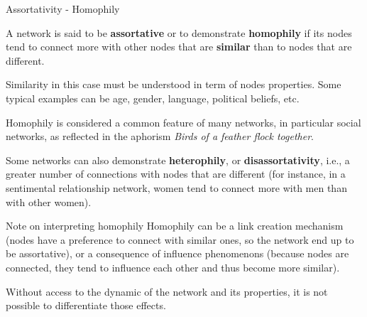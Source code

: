 











\begin{textbox}{Assortativity - Homophily}

A network is said to be \textbf{assortative} or to demonstrate \textbf{homophily} if its nodes tend to connect more with other nodes that are \textbf{similar} than to nodes that are different. 

Similarity in this case must be understood in term of nodes properties. Some typical examples can be age, gender, language, political beliefs, etc.

Homophily is considered a common feature of many networks, in particular social networks, as reflected in the aphorism \textit{Birds of a feather flock together}.

Some networks can also demonstrate \textbf{heterophily}, or \textbf{disassortativity}, i.e., a greater number of connections with nodes that are different (for instance, in a sentimental relationship network, women tend to connect more with men than with other women).



\end{textbox}


\begin{textbox}{Note on interpreting homophily}
Homophily can be a link creation mechanism (nodes have a preference to connect with similar ones, so the network end up to be assortative), or a consequence of influence phenomenons (because nodes are connected, they tend to influence each other and thus become more similar).

Without access to the dynamic of the network and its properties, it is not possible to differentiate those effects.


\end{textbox}

